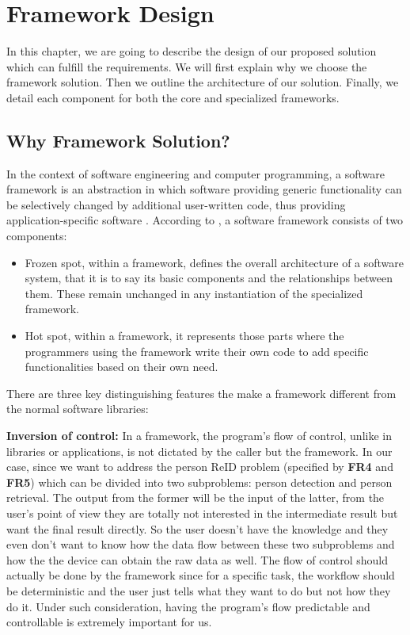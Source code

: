 \chapter{Framework Design}
\label{chap:fw-design}


In this chapter, we are going to describe the design of our proposed solution
which can fulfill the requirements.
We will first explain why we choose the framework solution. Then we outline the 
architecture of our solution. Finally, we detail each component for both the 
core and specialized frameworks.

\section{Why Framework Solution?}
\label{sec:fw-design-why}

In the context of software engineering and computer programming, a software
framework is an abstraction in which software providing generic functionality
can be selectively changed by additional user-written code, thus providing
application-specific software \cite{wikipedia-software-framework}.
According to \cite{software-framework-def}, a software framework consists of
two components:

\begin{itemize}
    \item Frozen spot, within a framework, defines the overall
    architecture of a software system, that it is to say its basic components
    and the relationships between them. These remain unchanged in any
    instantiation of the specialized framework.

    \item Hot spot, within a framework, it represents those parts where the
    programmers using the framework write their own code to add specific
    functionalities based on their own need.
\end{itemize}

There are three key distinguishing features the make a framework different from
the normal software libraries:

\noindent \textbf{Inversion of control:}
In a framework, the program's flow of control, unlike in libraries or
applications, is not dictated by the caller but the framework.
%
In our case, since we want to address the person ReID problem (specified by
\textbf{FR4} and \textbf{FR5}) which can be
divided into two subproblems: person detection and person retrieval.
The output from the former will be the input of the latter, from the user's
point of view they are totally not interested in the intermediate result but
want the final result directly. So the user doesn't have the knowledge and they even
don't want to know how the data flow between these two subproblems and how the
the device can obtain the raw data as well.
The flow of control should actually be done by the framework since for a
specific task, the workflow should be deterministic and the user just tells what
they want to do but not how they do it. Under such consideration, having
the program's flow predictable and controllable is extremely important for us.


